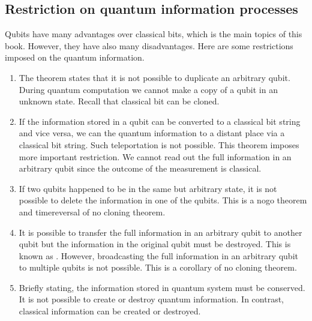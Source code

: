 \documentclass[letterpaper,10pt,english]{jupyterBook}
\begin{document}
\subsection{Restriction on quantum information processes}
\label{\detokenize{computation/qcomp:restriction-on-quantum-information-processes}}
\sphinxAtStartPar
Qubits have many advantages over classical bits, which is the main topics of this book.  However, they have also many disadvantages.  Here are some restrictions imposed on the quantum information.
\begin{enumerate}
%
\item {}
\sphinxAtStartPar
{}The theorem states that it is not possible to duplicate an arbitrary qubit.   During quantum computation we cannot make a copy of a qubit in an unknown state.  Recall that classical bit can be cloned.

\item {}
\sphinxAtStartPar
{}If the information stored in a qubit can be converted to a classical bit string and vice versa, we can  the quantum information to a distant place via a classical bit string. Such teleportation is not possible.  This theorem imposes more important restriction.  We cannot read out the full information in an arbitrary qubit since the outcome of the measurement is classical.

\item {}
\sphinxAtStartPar
{}If two qubits happened to be in the same but arbitrary state, it is not possible to delete the information in one of the qubits.  This is a no\sphinxhyphen{}go theorem and time\sphinxhyphen{}reversal of no cloning theorem.

\item {}
\sphinxAtStartPar
{}It is possible to transfer the full information in an arbitrary qubit to another qubit but the information in the original qubit must be destroyed.  This is known as .  However, broadcasting the full information in an arbitrary qubit to multiple qubits is not possible. This is a corollary of no cloning theorem.

\item {}
\sphinxAtStartPar
{}Briefly stating, the information stored in quantum system must be conserved. It is not possible to create or destroy quantum information.  In contrast, classical information can be created or destroyed.

\end{enumerate}
\end{document}

